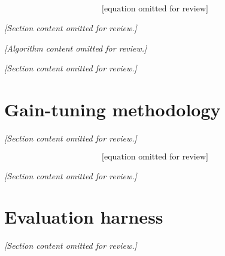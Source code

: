 \begin{equation}
\text{[equation omitted for review]}
\label{eq:app_cc_mpc_cost}
\end{equation}

\textit{[Section content omitted for review.]}

\begin{algorithm}[H]
\caption{Kinematic LTV MPC step (per environment)}
\label{alg:app_cc_mpc}
\begin{algorithmic}[1]
\State \textit{[Algorithm content omitted for review.]}
\end{algorithmic}
\end{algorithm}

\textit{[Section content omitted for review.]}

\section{Gain-tuning methodology}
\label{sec:app_cc_tuning}
\textit{[Section content omitted for review.]}

\begin{equation}
\text{[equation omitted for review]}
\label{eq:app_cc_tuning_key}
\end{equation}

\textit{[Section content omitted for review.]}

\section{Evaluation harness}
\label{sec:app_cc_eval}
\textit{[Section content omitted for review.]}
